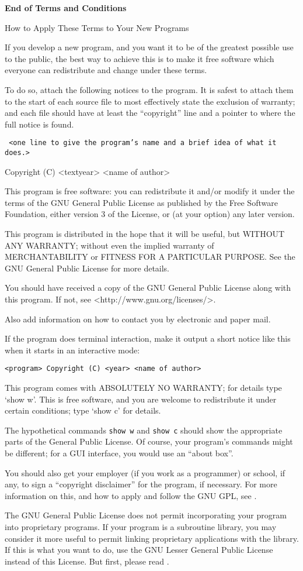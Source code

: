 {\bf End of Terms and Conditions}

\blank
How to Apply These Terms to Your New Programs

If you develop a new program, and you want it to be of the greatest possible use to the public, the best way to achieve this is to make it free software which everyone can redistribute and change under these terms.

To do so, attach the following notices to the program.  It is safest to attach them to the start of each source file to most effectively state the exclusion of warranty; and each file should have at least the ``copyright'' line and a pointer to where the full notice is found.

{\tt
<one line to give the program's name and a brief idea of what it does.>

Copyright (C) <textyear>  <name of author>

This program is free software: you can redistribute it and/or modify it under the terms of the GNU General Public License as published by the Free Software Foundation, either version 3 of the License, or (at your option) any later version.

This program is distributed in the hope that it will be useful, but WITHOUT ANY WARRANTY; without even the implied warranty of MERCHANTABILITY or FITNESS FOR A PARTICULAR PURPOSE.  See the GNU General Public License for more details.

You should have received a copy of the GNU General Public License along with this program.  If not, see <http://www.gnu.org/licenses/>.
}

Also add information on how to contact you by electronic and paper mail.

If the program does terminal interaction, make it output a short notice like this when it starts in an interactive mode:

{\tt <program>  Copyright (C) <year>  <name of author>

This program comes with ABSOLUTELY NO WARRANTY; for details type `show w'. This is free software, and you are welcome to redistribute it under certain conditions; type `show c' for details.}

The hypothetical commands {\tt show w} and {\tt show c} should show the appropriate parts of the General Public License.  Of course, your program's commands might be different; for a GUI interface, you would use an ``about box''.

You should also get your employer (if you work as a programmer) or school, if any, to sign a ``copyright disclaimer'' for the program, if necessary.  For more information on this, and how to apply and follow the GNU GPL, see .

The GNU General Public License does not permit incorporating your program into proprietary programs.  If your program is a subroutine library, you may consider it more useful to permit linking proprietary applications with the library.  If this is what you want to do, use the GNU Lesser General Public License instead of this License.  But first, please read .

\stopitemize


